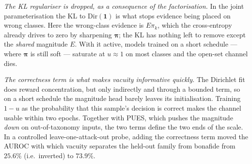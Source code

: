 \documentclass[conference]{IEEEtran}
\newcommand{\bs}[1]{\boldsymbol{#1}}
\begin{document}
\emph{The KL regulariser is dropped, as a consequence of the factorisation.} In the
joint parameterisation the KL to $\mathrm{Dir}(\bs{1})$ is what stops evidence being
placed on wrong classes. Here the wrong-class evidence is $E\pi_{k}$, which the
cross-entropy already drives to zero by sharpening $\bs{\pi}$; the KL has nothing
left to remove except the \emph{shared} magnitude $E$. With it active, models
trained on a short schedule --- where $\bs{\pi}$ is still soft --- saturate at
$u\!\approx\!1$ on most classes and the open-set channel dies.

\emph{The correctness term is what makes vacuity informative quickly.} The Dirichlet
fit does reward concentration, but only indirectly and through a bounded term, so on
a short schedule the magnitude head barely leaves its initialisation. Training
$1-u$ as the probability that this sample's decision is correct makes the channel
usable within two epochs. Together with PUES, which pushes the magnitude \emph{down}
on out-of-taxonomy inputs, the two terms define the two ends of the scale. In a
controlled leave-one-attack-out probe, adding the correctness term moved the AUROC
with which vacuity separates the held-out family from bonafide from $25.6\%$
(i.e.\ inverted) to $73.9\%$.
\end{document}
